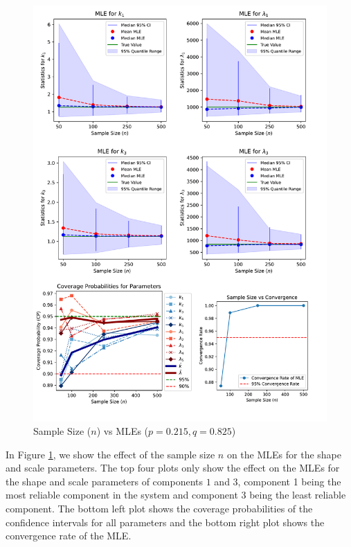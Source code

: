 \documentclass[
]{article}
\theoremstyle{definition}
\theoremstyle{plain}
\theoremstyle{definition}
\theoremstyle{definition}
\theoremstyle{definition}
\theoremstyle{definition}
\theoremstyle{remark}
\begin{document}
\begin{figure}

{\centering \includegraphics[width=1\linewidth]{image/5_system_samp_size_fig} 

}

\caption{Sample Size ($n$) vs MLEs ($p = 0.215, q = 0.825$)}\label{fig:samp-size-n-vs-stats}
\end{figure}

In Figure \ref{fig:samp-size-n-vs-stats}, we show the effect of the sample size
\(n\) on the MLEs for the shape and scale parameters. The top four plots only show
the effect on the MLEs for the shape and scale parameters of components \(1\) and
\(3\), component 1 being the most reliable component in the system and component 3
being the least reliable component. The bottom left plot shows the coverage
probabilities of the confidence intervals for all parameters and the bottom
right plot shows the convergence rate of the MLE.
\end{document}
